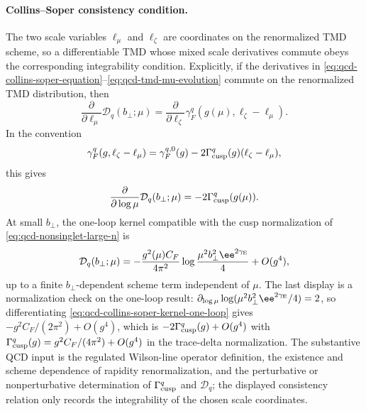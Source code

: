 \paragraph{Collins--Soper consistency condition.}
The two scale variables \(\ell_\mu\) and \(\ell_\zeta\) are coordinates on the
renormalized TMD scheme, so a differentiable TMD whose mixed scale derivatives
commute obeys the corresponding integrability condition.  Explicitly, if the
derivatives in
\eqref{eq:qcd-collins-soper-equation}--\eqref{eq:qcd-tmd-mu-evolution}
commute on the renormalized TMD distribution, then
\begin{equation}
  \frac{\partial}{\partial\ell_\mu}\mathcal D_q(b_\perp;\mu)
  =
  \frac{\partial}{\partial\ell_\zeta}
  \gamma_F^q(g(\mu),\ell_\zeta-\ell_\mu).
  \label{eq:qcd-collins-soper-integrability}
\end{equation}
In the convention
\[
  \gamma_F^q(g,\ell_\zeta-\ell_\mu)
  =
  \gamma_F^{q,0}(g)
  -2\Gamma_{\rm cusp}^q(g)(\ell_\zeta-\ell_\mu),
\]
this gives
\begin{equation}
  \frac{\partial}{\partial\log\mu}\mathcal D_q(b_\perp;\mu)
  =
  -2\Gamma_{\rm cusp}^q(g(\mu)).
  \label{eq:qcd-collins-soper-cusp}
\end{equation}
At small \(b_\perp\), the one-loop kernel compatible with the cusp
normalization of \eqref{eq:qcd-nonsinglet-large-n} is
\begin{equation}
  \mathcal D_q(b_\perp;\mu)
  =
  -\frac{g^2(\mu)C_F}{4\pi^2}
  \log\frac{\mu^2 b_\perp^2\ee^{2\gamma_{\rm E}}}{4}
  +O(g^4),
  \label{eq:qcd-collins-soper-kernel-one-loop}
\end{equation}
up to a finite \(b_\perp\)-dependent scheme term independent of \(\mu\).
The last display is a normalization check on the one-loop result:
\(\partial_{\log\mu}\log(\mu^2b_\perp^2\ee^{2\gamma_{\rm E}}/4)=2\), so
differentiating \eqref{eq:qcd-collins-soper-kernel-one-loop} gives
\(-g^2C_F/(2\pi^2)+O(g^4)\), which is
\(-2\Gamma_{\rm cusp}^q(g)+O(g^4)\) with
\(\Gamma_{\rm cusp}^q(g)=g^2C_F/(4\pi^2)+O(g^4)\) in the trace-delta
normalization.  The substantive QCD input is the regulated Wilson-line
operator definition, the existence and scheme dependence of rapidity
renormalization, and the perturbative or nonperturbative determination of
\(\Gamma_{\rm cusp}^q\) and \(\mathcal D_q\); the displayed consistency
relation only records the integrability of the chosen scale coordinates.

